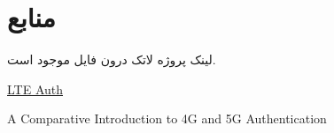 \section{منابع}

لینک پروژه لاتک درون فایل
موجود است.

\vspace{1cm}
\small

\begin{latin}
    \href{https://www.netmanias.com/en/?m=view&id=techdocs&no=5902}{LTE Auth}
    \newline
    
    A Comparative Introduction to 4G and 5G Authentication
\end{latin}
